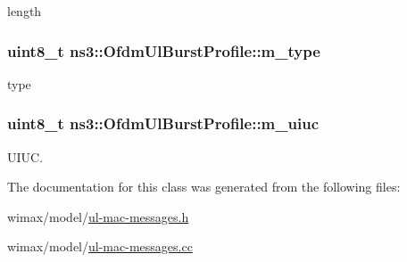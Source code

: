length 

\subsubsection[{\texorpdfstring{m\+\_\+type}{m_type}}]{\setlength{\rightskip}{0pt plus 5cm}uint8\+\_\+t ns3\+::\+Ofdm\+Ul\+Burst\+Profile\+::m\+\_\+type\hspace{0.3cm}{\ttfamily [private]}}\hypertarget{classns3_1_1OfdmUlBurstProfile_a3310244574658f1dc41aba964c5d1c31}{}\label{classns3_1_1OfdmUlBurstProfile_a3310244574658f1dc41aba964c5d1c31}


type 

\subsubsection[{\texorpdfstring{m\+\_\+uiuc}{m_uiuc}}]{\setlength{\rightskip}{0pt plus 5cm}uint8\+\_\+t ns3\+::\+Ofdm\+Ul\+Burst\+Profile\+::m\+\_\+uiuc\hspace{0.3cm}{\ttfamily [private]}}\hypertarget{classns3_1_1OfdmUlBurstProfile_a30a8c14666e0bc78126bcb6a57acd102}{}\label{classns3_1_1OfdmUlBurstProfile_a30a8c14666e0bc78126bcb6a57acd102}


U\+I\+UC. 



The documentation for this class was generated from the following files\+:\begin{DoxyCompactItemize}
\item 
wimax/model/\hyperlink{ul-mac-messages_8h}{ul-\/mac-\/messages.\+h}\item 
wimax/model/\hyperlink{ul-mac-messages_8cc}{ul-\/mac-\/messages.\+cc}\end{DoxyCompactItemize}
